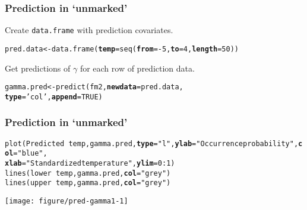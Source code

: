 \documentclass[color=usenames,dvipsnames]{beamer}\usepackage[]{graphicx}\usepackage[]{color}
\makeatletter
\newcommand{\hlnum}[1]{\textcolor[rgb]{0.69,0.494,0}{#1}}%
\newcommand{\hlstr}[1]{\textcolor[rgb]{0.749,0.012,0.012}{#1}}%
\newcommand{\hlopt}[1]{\textcolor[rgb]{0,0,0}{#1}}%
\newcommand{\hlstd}[1]{\textcolor[rgb]{0,0,0}{#1}}%
\newcommand{\hlkwb}[1]{\textcolor[rgb]{0,0.341,0.682}{#1}}%
\newcommand{\hlkwc}[1]{\textcolor[rgb]{0,0,0}{\textbf{#1}}}%
\newcommand{\hlkwd}[1]{\textcolor[rgb]{0.004,0.004,0.506}{#1}}%
\newenvironment{kframe}{%
 \def\at@end@of@kframe{}%
 \ifinner\ifhmode%
  \def\at@end@of@kframe{\end{minipage}}%
  \begin{minipage}{\columnwidth}%
 \fi\fi%
 \def\FrameCommand##1{\hskip\@totalleftmargin \hskip-\fboxsep
 \colorbox{shadecolor}{##1}\hskip-\fboxsep
     \hskip-\linewidth \hskip-\@totalleftmargin \hskip\columnwidth}%
 \MakeFramed {\advance\hsize-\width
   \@totalleftmargin\z@ \linewidth\hsize
   \@setminipage}}%
 {\par\unskip\endMakeFramed%
 \at@end@of@kframe}
\newenvironment{knitrout}{}{} %
\makeatother
\begin{document}
\begin{frame}[fragile]
  \frametitle{Prediction in `unmarked'}
  Create \texttt{data.frame} with prediction covariates. 
\begin{knitrout}\footnotesize
{}\color{fgcolor}\begin{kframe}
\begin{alltt}
\hlstd{pred.data} \hlkwb{<-} \hlkwd{data.frame}\hlstd{(}\hlkwc{temp}\hlstd{=}\hlkwd{seq}\hlstd{(}\hlkwc{from}\hlstd{=}\hlopt{-}\hlnum{5}\hlstd{,} \hlkwc{to}\hlstd{=}\hlnum{4}\hlstd{,} \hlkwc{length}\hlstd{=}\hlnum{50}\hlstd{))}
\end{alltt}
\end{kframe}
\end{knitrout}
\pause
\vfill
Get predictions of $\gamma$ for each row of prediction data.
\begin{knitrout}\footnotesize
{}\color{fgcolor}\begin{kframe}
\begin{alltt}
\hlstd{gamma.pred} \hlkwb{<-} \hlkwd{predict}\hlstd{(fm2,} \hlkwc{newdata}\hlstd{=pred.data,}
                      \hlkwc{type}\hlstd{=}\hlstr{'col'}\hlstd{,} \hlkwc{append}\hlstd{=}\hlnum{TRUE}\hlstd{)}
\end{alltt}
\end{kframe}
\end{knitrout}
\end{frame}







\begin{frame}[fragile]
  \frametitle{Prediction in `unmarked'}
\begin{knitrout}\tiny
{}\color{fgcolor}\begin{kframe}
\begin{alltt}
\hlkwd{plot}\hlstd{(Predicted} \hlopt{~} \hlstd{temp, gamma.pred,} \hlkwc{type}\hlstd{=}\hlstr{"l"}\hlstd{,} \hlkwc{ylab}\hlstd{=}\hlstr{"Occurrence probability"}\hlstd{,} \hlkwc{col}\hlstd{=}\hlstr{"blue"}\hlstd{,}
     \hlkwc{xlab}\hlstd{=}\hlstr{"Standardized temperature"}\hlstd{,} \hlkwc{ylim}\hlstd{=}\hlnum{0}\hlopt{:}\hlnum{1}\hlstd{)}
\hlkwd{lines}\hlstd{(lower} \hlopt{~} \hlstd{temp, gamma.pred,} \hlkwc{col}\hlstd{=}\hlstr{"grey"}\hlstd{)}
\hlkwd{lines}\hlstd{(upper} \hlopt{~} \hlstd{temp, gamma.pred,} \hlkwc{col}\hlstd{=}\hlstr{"grey"}\hlstd{)}
\end{alltt}
\end{kframe}

{\centering \texttt{[image: figure/pred-gamma1-1]} 

}



\end{knitrout}
\end{frame}
\end{document}
